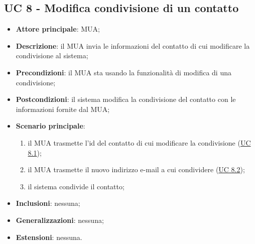 \subsection{UC 8 - Modifica condivisione di un contatto} \label{sec:UC8}

    \begin{itemize}
        \item \textbf{Attore principale}: MUA;
        \item \textbf{Descrizione}: il MUA invia le informazioni del contatto di cui modificare la condivisione al sistema;
        \item \textbf{Precondizioni}: il MUA sta usando la funzionalità di modifica di una condivisione;
        \item \textbf{Postcondizioni}: il sistema modifica la condivisione del contatto con le informazioni fornite dal MUA;
        \item \textbf{Scenario principale}:
            \begin{enumerate}
                \item il MUA trasmette l'id del contatto di cui modificare la condivisione (\hyperref[sec:UC8.1]{UC 8.1});
                \item il MUA trasmette il nuovo indirizzo e-mail a cui condividere (\hyperref[sec:UC8.2]{UC 8.2});
                \item il sistema condivide il contatto;
            \end{enumerate}
        \item \textbf{Inclusioni}: nessuna;
        \item \textbf{Generalizzazioni}: nessuna;
        \item \textbf{Estensioni}: nessuna.
    \end{itemize}

